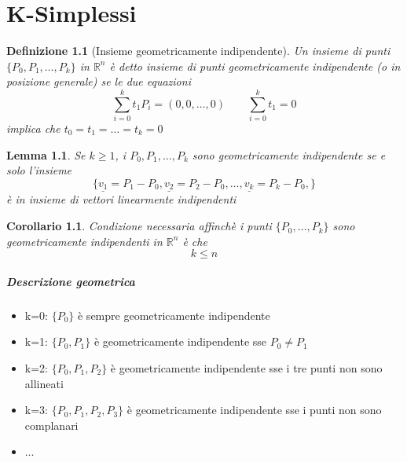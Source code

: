 \documentclass[a4paper]{report}
\newtheorem{definition}{Definizione}
\newtheorem{corollary}{Corollario}
\newtheorem{lemma}{Lemma}
\newcommand{\R}{\ensuremath{\mathbb{R}}}
\newcommand{\geoind}[1]{geometricamente indipendent{#1} }
\begin{document}
\chapter{K-Simplessi}
\begin{definition}[Insieme geometricamente indipendente]
    Un insieme di punti $\{P_0,P_1,\dots,P_k\}$ in $\R^n$ è detto insieme di punti geometricamente indipendente (o in posizione generale) se le due equazioni
    \[
        \sum_{i=0}^k t_1P_i=(0,0,\dots,0)\quad\quad \sum_{i=0}^k t_1=0
    \]
    implica che $t_0=t_1=\dots=t_k=0$
\end{definition}
\begin{lemma}
    Se $k\geq 1$, i ${P_0,P_1,\dots,P_k}$ sono geometricamente indipendente se e solo l'insieme
    \[
        \{\underline{v_1}=P_1-P_0,\underline{v_2}=P_2-P_0,\dots,\underline{v_k}=P_k-P_0,\}
    \]
    è in insieme di vettori linearmente indipendenti
\end{lemma}
\begin{corollary}
    Condizione necessaria affinchè i punti $\{P_0,\dots,P_k\}$ sono geometricamente indipendenti in $\R^n$ è che
    \[
        k\leq n
    \]
\end{corollary}
\paragraph{Descrizione geometrica}
\begin{itemize}
    \item k=0: $\{P_0\}$ è sempre \geoind{e}
    \item k=1: $\{P_0,P_1\}$ è \geoind{e} sse $P_0\neq P_1$
    \item k=2: $\{P_0,P_1,P_2\}$ è \geoind{e} sse i tre punti non sono allineati
    \item k=3: $\{P_0,P_1,P_2,P_3\}$ è \geoind{e} sse i punti non sono complanari
    \item $\dots$
\end{itemize}
\end{document}
